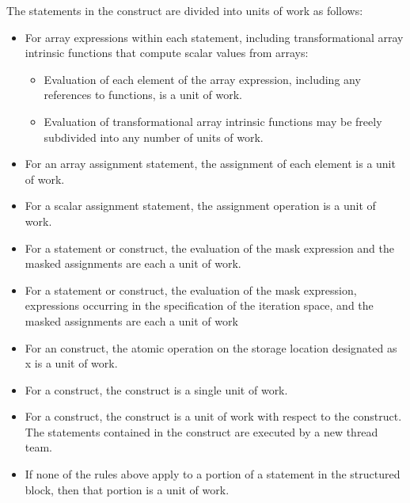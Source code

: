 The statements in the  construct are divided into units of work as follows:

\begin{itemize}
\item For array expressions within each statement, including transformational array 
intrinsic functions that compute scalar values from arrays:

\begin{itemize} %
\item Evaluation of each element of the array expression, including any references to 
 functions, is a unit of work.

\item Evaluation of transformational array intrinsic functions may be freely subdivided 
into any number of units of work.
\end{itemize}

\item For an array assignment statement, the assignment of each element is a unit of work.

\item For a scalar assignment statement, the assignment operation is a unit of work.

\item For a  statement or construct, the evaluation of the mask expression and the 
masked assignments are each a unit of work.

\item For a  statement or construct, the evaluation of the mask expression, 
expressions occurring in the specification of the iteration space, and the masked 
assignments are each a unit of work

\item For an  construct, the atomic operation on the storage location designated as 
x is a unit of work.

\item For a  construct, the construct is a single unit of work.

\item For a  construct, the construct is a unit of work with respect to the 
 construct. The statements contained in the  construct are 
executed by a new thread team.

\item If none of the rules above apply to a portion of a statement in the structured block, 
then that portion is a unit of work.
\end{itemize}

